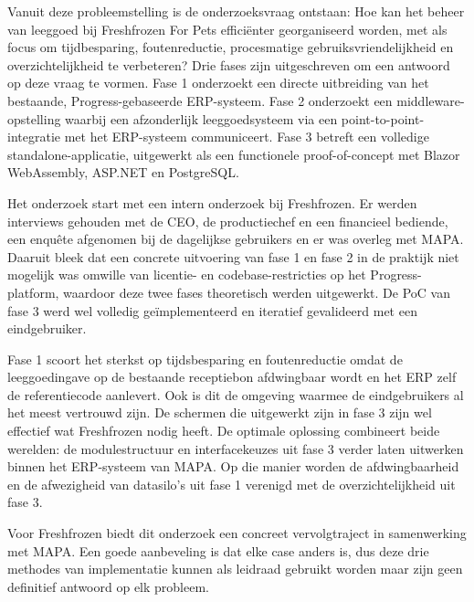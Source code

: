 Vanuit deze probleemstelling is de onderzoeksvraag ontstaan: Hoe kan het beheer van leeggoed bij Freshfrozen For Pets efficiënter georganiseerd worden, met als focus om tijdbesparing, foutenreductie, procesmatige gebruiksvriendelijkheid en overzichtelijkheid te verbeteren? Drie fases zijn uitgeschreven om een antwoord op deze vraag te vormen. Fase 1 onderzoekt een directe uitbreiding van het bestaande, Progress-gebaseerde ERP-systeem. Fase 2 onderzoekt een middleware-opstelling waarbij een afzonderlijk leeggoedsysteem via een point-to-point-integratie met het ERP-systeem communiceert. Fase 3 betreft een volledige standalone-applicatie, uitgewerkt als een functionele proof-of-concept met Blazor WebAssembly, ASP.NET en PostgreSQL.

Het onderzoek start met een intern onderzoek bij Freshfrozen. Er werden interviews gehouden met de CEO, de productiechef en een financieel bediende, een enquête afgenomen bij de dagelijkse gebruikers en er was overleg met MAPA. Daaruit bleek dat een concrete uitvoering van fase 1 en fase 2 in de praktijk niet mogelijk was omwille van licentie- en codebase-restricties op het Progress-platform, waardoor deze twee fases theoretisch werden uitgewerkt. De PoC van fase 3 werd wel volledig geïmplementeerd en iteratief gevalideerd met een eindgebruiker.

Fase 1 scoort het sterkst op tijdsbesparing en foutenreductie omdat de leeggoedingave op de bestaande receptiebon afdwingbaar wordt en het ERP zelf de referentiecode aanlevert. Ook is dit de omgeving waarmee de eindgebruikers al het meest vertrouwd zijn. De schermen die uitgewerkt zijn in fase 3 zijn wel effectief wat Freshfrozen nodig heeft. De optimale oplossing combineert beide werelden: de modulestructuur en interfacekeuzes uit fase 3 verder laten uitwerken binnen het ERP-systeem van MAPA. Op die manier worden de afdwingbaarheid en de afwezigheid van datasilo's uit fase 1 verenigd met de overzichtelijkheid uit fase 3.

Voor Freshfrozen biedt dit onderzoek een concreet vervolgtraject in samenwerking met MAPA. 
Een goede aanbeveling is dat elke case anders is, dus deze drie methodes van implementatie kunnen als leidraad gebruikt worden maar zijn geen definitief antwoord op elk probleem. 
